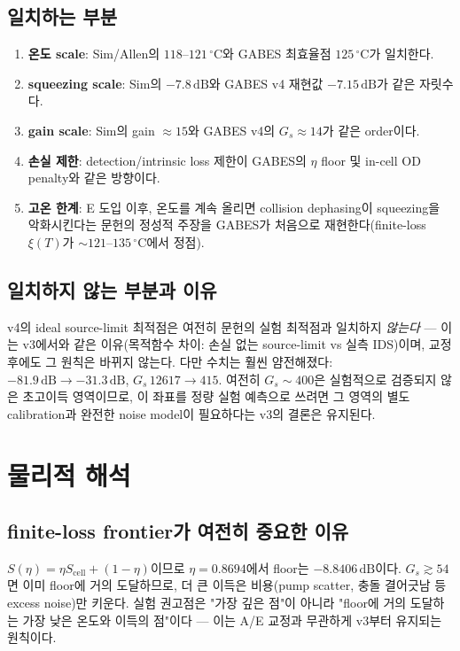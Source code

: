 \documentclass[11pt,a4paper]{article}
\newcommand{\dB}{\,\mathrm{dB}}
\newcommand{\degC}{\,^{\circ}\mathrm{C}}
\begin{document}
\subsection{일치하는 부분}
\begin{enumerate}[nosep]
\item \textbf{온도 scale}: Sim/Allen의 $118$--$121\degC$와 GABES 최효율점
      $125\degC$가 일치한다.
\item \textbf{squeezing scale}: Sim의 $-7.8\dB$와 GABES v4 재현값
      $-7.15\dB$가 같은 자릿수다.
\item \textbf{gain scale}: Sim의 gain $\approx15$와 GABES v4의
      $G_s\approx14$가 같은 order이다.
\item \textbf{손실 제한}: detection/intrinsic loss 제한이 GABES의 $\eta$
      floor 및 in-cell OD penalty와 같은 방향이다.
\item \textbf{고온 한계}: E 도입 이후, 온도를 계속 올리면 collision
      dephasing이 squeezing을 악화시킨다는 문헌의 정성적 주장을 GABES가 처음으로
      재현한다(finite-loss $\xi(T)$가 $\sim121$--$135\degC$에서 정점).
\end{enumerate}

\subsection{일치하지 않는 부분과 이유}
v4의 ideal source-limit 최적점은 여전히 문헌의 실험 최적점과 일치하지
\emph{않는다} — 이는 v3에서와 같은 이유(목적함수 차이: 손실 없는
source-limit vs 실측 IDS)이며, 교정 후에도 그 원칙은 바뀌지 않는다. 다만
수치는 훨씬 얌전해졌다: $-81.9\dB\to-31.3\dB$, $G_s\,12617\to415$. 여전히
$G_s\sim400$은 실험적으로 검증되지 않은 초고이득 영역이므로, 이 좌표를 정량
실험 예측으로 쓰려면 그 영역의 별도 calibration과 완전한 noise model이
필요하다는 v3의 결론은 유지된다.

\section{물리적 해석}

\subsection{finite-loss frontier가 여전히 중요한 이유}
$S(\eta)=\eta S_{\mathrm{cell}}+(1-\eta)$이므로 $\eta=0.8694$에서 floor는
$-8.8406\dB$이다. $G_s\gtrsim54$면 이미 floor에 거의 도달하므로, 더 큰 이득은
비용(pump scatter, 충돌 결어긋남 등 excess noise)만 키운다. 실험 권고점은
"가장 깊은 점"이 아니라 "floor에 거의 도달하는 가장 낮은 온도와 이득의
점"이다 — 이는 A/E 교정과 무관하게 v3부터 유지되는 원칙이다.
\end{document}

